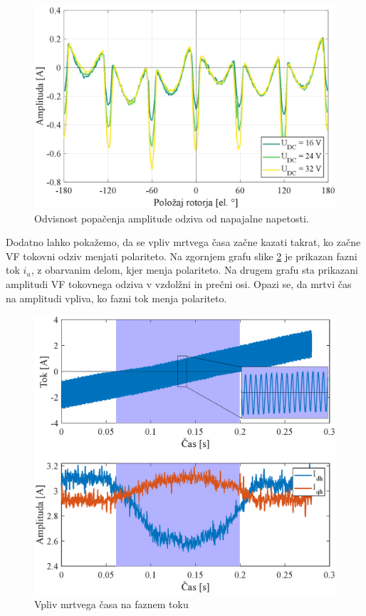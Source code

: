 \documentclass[a4paper,twoside,openright,12pt,slovene]{book}
\begin{document}
\begin{figure}[!htbp]
    \centering
    \includegraphics[width=0.95\columnwidth]{Slike/mrtviCasNapetost.eps}
    \caption{\label{mrtviCasNapetost} Odvisnost popačenja amplitude odziva od napajalne napetosti. }
\end{figure}

\renewcommand*{\thefootnote}{\fnsymbol{footnote}}

\newpage

Dodatno lahko pokažemo, da se vpliv mrtvega časa začne kazati takrat, ko začne VF tokovni odziv menjati polariteto. Na zgornjem grafu slike \ref{mrtviCasFazniTok} je prikazan fazni tok $i_u$, z
obarvanim delom, kjer menja polariteto. Na drugem grafu sta prikazani amplitudi VF tokovnega odziva v vzdolžni in prečni osi. Opazi se, da mrtvi čas na amplitudi vpliva, ko fazni tok menja polariteto.

\begin{figure}[!htbp]
    \centering
    \includegraphics[width=0.99\columnwidth]{Slike/mrtviCasFazniTok.eps}
    \caption{\label{mrtviCasFazniTok} Vpliv mrtvega časa na faznem toku }
\end{figure}
\end{document}

